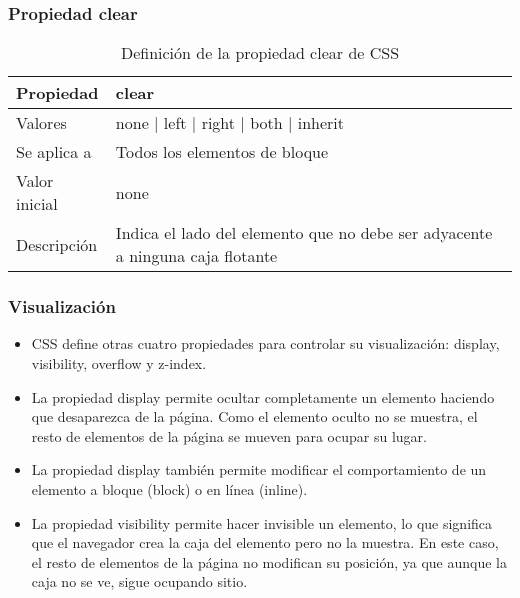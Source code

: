 
\begin{frame}
\frametitle{Propiedad clear}

\begin{center}
  \begin{table}
   \begin{tabular}{p{1.8cm}p{7.8cm}}
Propiedad & \bf{clear} \\ \hline
Valores& none | left | right | both | inherit \\ \hline
Se aplica a& Todos los elementos de bloque \\ \hline
Valor inicial& none \\ \hline
Descripción& Indica el lado del elemento que no debe ser adyacente a ninguna caja flotante \\ \hline
  \end{tabular}
   \caption{Definición de la propiedad clear de CSS}
 \end{table}
\end{center}


\end{frame}



\begin{frame}
\frametitle{Visualización}

\begin{itemize}
  \item CSS define otras cuatro propiedades para controlar su visualización: display, visibility, overflow y z-index.
  \item La propiedad display permite ocultar completamente un elemento haciendo que desaparezca de la página. Como el elemento oculto no se muestra, el resto de elementos de la página se mueven para ocupar su lugar.
  \item La propiedad display también permite modificar el comportamiento de un elemento a bloque (block) o en línea (inline).
  \item La propiedad visibility permite hacer invisible un elemento, lo que significa que el navegador crea la caja del elemento pero no la muestra. En este caso, el resto de elementos de la página no modifican su posición, ya que aunque la caja no se ve, sigue ocupando sitio.
\end{itemize}

\end{frame}


